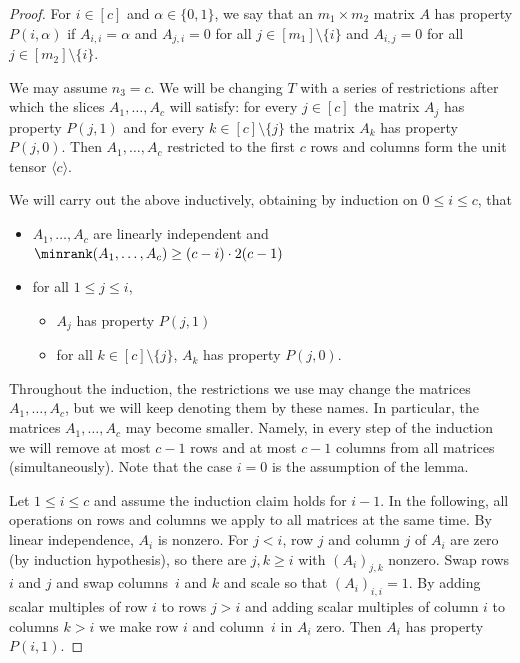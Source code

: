 \begin{proof}
%
For $i \in [c]$ and $\alpha \in \{0,1\}$, we say that an $m_1\times m_2$ matrix $A$ has property $P(i,\alpha)$ if $A_{i,i} = \alpha$ and $A_{j, i} = 0$ for all $j \in [m_1]\setminus \{i\}$ and $A_{i,j} = 0$ for all $j \in [m_2] \setminus \{i\}$.

We may assume $n_3 = c$.
We will be changing $T$ with a series of restrictions after which the slices $A_1, \ldots, A_c$ will satisfy: for every $j \in [c]$ the matrix $A_j$ has property $P(j, 1)$ and for every $k \in [c] \setminus \{j\}$ the matrix $A_k$ has property $P(j, 0)$. Then $A_1, \ldots, A_c$ restricted to the first $c$ rows and columns form the unit tensor $\langle c\rangle$.

We will carry out the above inductively, obtaining by induction on $0 \leq i \leq c$, that 
\begin{itemize}
\item $A_1, \ldots, A_c$ are linearly independent and $\minrank(A_1, \ldots, A_c) \geq (c-i)\cdot 2(c-1)$
\item for all $1 \leq j \leq i$, 
\begin{itemize}
    \item $A_j$ has property $P(j, 1)$
    \item for all $k \in [c] \setminus \{j\}$, $A_k$ has property $P(j, 0)$.
\end{itemize}  
\end{itemize}
Throughout the induction, the restrictions we use may change the matrices $A_1, \ldots, A_c$, but we will keep denoting them by these names. In particular, the matrices $A_1, \ldots, A_c$ may become smaller. Namely, in every step of the induction we will remove at most $c-1$ rows and at most $c-1$ columns from all matrices (simultaneously). Note that the case $i=0$ is the assumption of the lemma.

Let $1 \leq i\leq c$ and assume the induction claim holds for $i-1$. 
In the following, all operations on rows and columns we apply to all matrices at the same time.
By linear independence, $A_i$ is nonzero. For $j < i$, row $j$ and column $j$ of $A_i$ are zero (by induction hypothesis), so there are $j,k \geq i$ with $(A_i)_{j,k}$ nonzero.
Swap rows $i$ and $j$ and swap columns~$i$ and $k$ and scale so that $(A_i)_{i,i} = 1$. By adding scalar multiples of row $i$ to rows $j > i$ and adding scalar multiples of column $i$ to columns $k > i$ we make row $i$ and column~$i$ in $A_i$ zero. Then $A_i$ has property $P(i,1)$. 


\end{proof}
